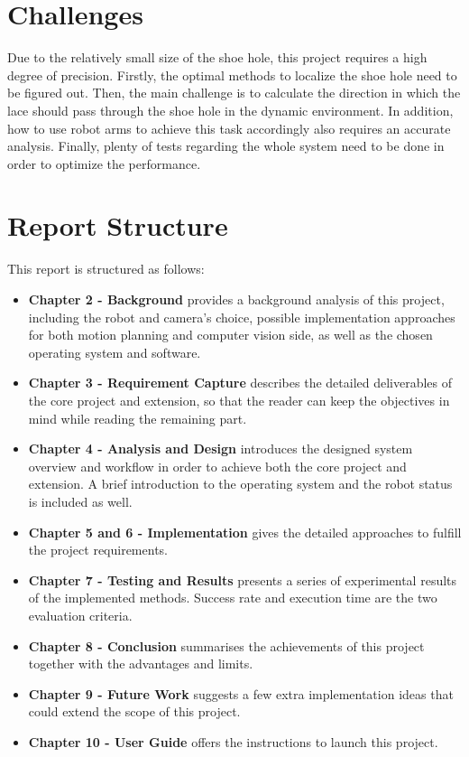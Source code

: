 \section{Challenges}
Due to the relatively small size of the shoe hole, this project requires a high degree of precision. Firstly, the optimal methods to localize the shoe hole need to be figured out. Then, the main challenge is to calculate the direction in which the lace should pass through the shoe hole in the dynamic environment. In addition, how to use robot arms to achieve this task accordingly also requires an accurate analysis. Finally, plenty of tests regarding the whole system need to be done in order to optimize the performance.

\section{Report Structure}
This report is structured as follows:

\begin{itemize}
    \item \textbf{Chapter 2 - Background} provides a background analysis of this project, including the robot and camera's choice, possible implementation approaches for both motion planning and computer vision side, as well as the chosen operating system and software. 
    \item \textbf{Chapter 3 - Requirement Capture} describes the detailed deliverables of the core project and extension, so that the reader can keep the objectives in mind while reading the remaining part.
    \item \textbf{Chapter 4 - Analysis and Design} introduces the designed system overview and workflow in order to achieve both the core project and extension. A brief introduction to the operating system and the robot status is included as well.
    \item \textbf{Chapter 5 and 6 - Implementation} gives the detailed approaches to fulfill the project requirements.
    \item \textbf{Chapter 7 - Testing and Results} presents a series of experimental results of the implemented methods. Success rate and execution time are the two evaluation criteria.
    \item \textbf{Chapter 8 - Conclusion} summarises the achievements of this project together with the advantages and limits. 
    \item \textbf{Chapter 9 - Future Work} suggests a few extra implementation ideas that could extend the scope of this project. 
    \item \textbf{Chapter 10 - User Guide} offers the instructions to launch this project.
\end{itemize}
